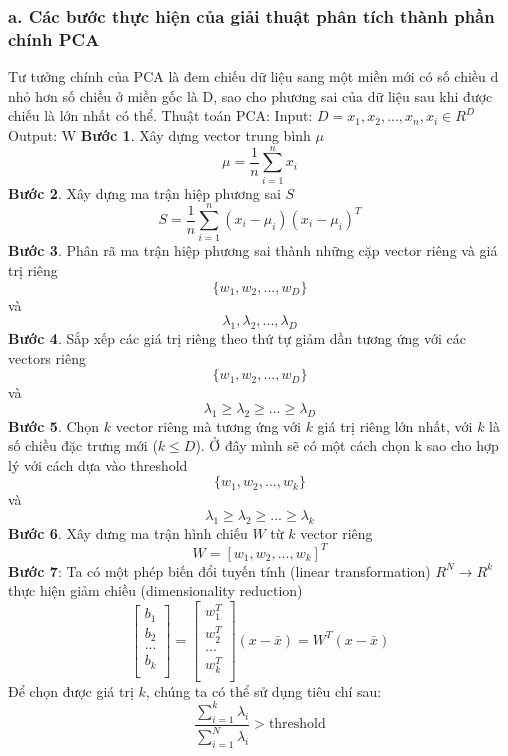 \documentclass{article}
\begin{document}
	\subsubsection{a. Các bước thực hiện của giải thuật phân tích thành phần chính PCA}
	\qquad Tư tưởng chính của PCA là đem chiếu dữ liệu sang một miền mới có số chiều d nhỏ hơn số chiều ở miền gốc là D, sao cho phương sai của dữ liệu sau khi được chiếu là lớn nhất có thể.\newline
	Thuật toán PCA:\newline
	Input: $D = {x_1, x_2, ..., x_n}, x_i \in R^{D}$\newline
	Output: W \newline
	\textbf{Bước 1}. Xây dựng vector trung bình $\mu$ 
	$$\mu = \frac{1}{n}\sum_{i=1}^{n}x_i$$
	\textbf{Bước 2}. Xây dựng ma trận hiệp phương sai $S$ 
	$$S = \frac{1}{n}\sum_{i=1}^{n}(x_i - \mu_i)(x_i - \mu_i)^T$$
	\textbf{Bước 3}. Phân rã ma trận hiệp phương sai thành những cặp vector riêng và giá trị riêng
	$$\{w_1, w_2, ..., w_D\}$$ 
	và 	
	$$\lambda_1, \lambda_2, ..., \lambda_D$$
	\textbf{Bước 4}. Sắp xếp các giá trị riêng theo thứ tự giảm dần tương ứng với các vectors riêng 
	$$\{w_1, w_2, ..., w_D\}$$ 
	và 
	$$\lambda_1 \geq \lambda_2 \geq ... \geq \lambda_D$$
	\textbf{Bước 5}. Chọn $k$ vector riêng mà tương ứng với $k$ giá trị riêng lớn nhất, với $k$ là số chiều đặc trưng mới  ($k \leq D$). Ở đây mình sẽ có một cách chọn k sao cho hợp lý với cách dựa vào threshold
	$$\{w_1, w_2, ..., w_k\}$$ 
	và 
	$$\lambda_1 \geq \lambda_2 \geq ... \geq \lambda_k$$
	\textbf{Bước 6}. Xây dưng ma trận hình chiếu $W$ từ $k$ vector riêng 
	$$W = [w_1, w_2, ..., w_k]^T$$
	\textbf{Bước 7}: Ta có một phép biến đổi tuyến tính (linear transformation) $R^N \rightarrow R^k$ thực hiện giảm chiều (dimensionality reduction)
	$$
	\begin{bmatrix}
		b_1 \\
		b_2 \\
		... \\
		b_k \\
	\end{bmatrix} = 
	\begin{bmatrix}
		w_1^T \\
		w_2^T \\
		... \\
		w_k^T \\
	\end{bmatrix}(x- \bar{x}) = W^T(x- \bar{x})
	$$
	Để chọn được giá trị $k$, chúng ta có thể sử dụng tiêu chí sau:
	$$\frac{\sum_{i=1}^k\lambda_i}{\sum_{i=1}^N\lambda_i} > \text{threshold}$$
\end{document}
